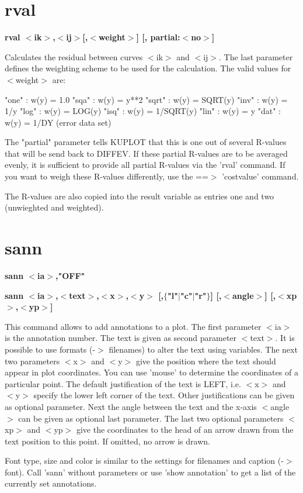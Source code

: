 \section{rval}
{\bf rval $ <$ik$> $,$ <$ij$> $[,$ <$weight$> $]  [, partial:$ <$no$> $] \par }
\par
\vspace{3pt}
Calculates the residual between curves $ <$ik$> $ and $ <$ij$> $. 
The last parameter defines the weighting scheme to be used for 
the calculation. The valid values for $ <$weight$> $ are: 
\par
\begin{MacVerbatim}
  "one"  : w(y) = 1.0              "sqa"  : w(y) = y**2
  "sqrt" : w(y) = SQRT(y)          "inv"  : w(y) = 1/y
  "log"  : w(y) = LOG(y)           "isq"  : w(y) = 1/SQRT(y)
  "lin"  : w(y) = y                "dat"  : w(y) = 1/DY (error data set)
\end{MacVerbatim}
The "partial" parameter tells KUPLOT that this is one out of 
several R-values that will be send back to DIFFEV. If these 
partial R-values are to be averaged evenly, it is sufficient to 
provide all partial R-values via the 'rval' command. 
If you want to weigh these R-values differently, use the 
==$> $ 'costvalue' command. 
\par
The R-values are also copied into the result variable as entries 
one and two (unwieghted and weighted). 
\section{sann}
{\bf sann $ <$ia$> $,"OFF" \par }
{\bf sann $ <$ia$> $,$ <$text$> $,$ <$x$> $,$ <$y$> $ [,$ \{$"l"$| $"c"$| $"r"$\} $] [,$ <$angle$> $] [,$ <$xp$> $,$ <$yp$> $] \par }
\par
\vspace{3pt}
This command allows to add annotations to a plot. The first 
parameter $ <$ia$> $ is the annotation number. The text is given 
as second parameter $ <$text$> $. It is possible to use formats 
(-$> $ filenames) to alter the text using variables. The next 
two parameters $ <$x$> $ and $ <$y$> $ give the position where the text 
should appear in plot coordinates. You can use 'mouse' to determine 
the coordinates of a particular point. The default justification 
of the text is LEFT, i.e. $ <$x$> $ and $ <$y$> $ specify the lower left 
corner of the text. Other justifications can be given as 
optional parameter. Next the angle between the text and the 
x-axis $ <$angle$> $ can be given as optional last parameter. 
The last two optional parameters $ <$xp$> $ and $ <$yp$> $ give the coordinates 
to the head of an arrow drawn from the text position to this 
point. If omitted, no arrow is drawn. 
\par
Font type, size and color is similar to the settings for 
filenames and caption (-$> $ font). Call 'sann' without parameters 
or use 'show annotation' to get a list of the currently set 
annotations. 
